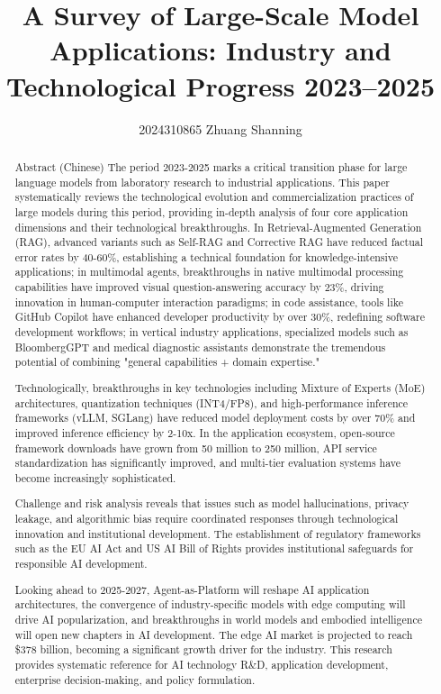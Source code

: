 \documentclass{article}
\title{A Survey of Large-Scale Model Applications: Industry and Technological Progress 2023–2025}
\author{2024310865 Zhuang Shanning}
\begin{document}
\maketitle

\begin{abstract}
  Abstract (Chinese)  
  The period 2023-2025 marks a critical transition phase for large language models from laboratory research to industrial applications. This paper systematically reviews the technological evolution and commercialization practices of large models during this period, providing in-depth analysis of four core application dimensions and their technological breakthroughs. In Retrieval-Augmented Generation (RAG), advanced variants such as Self-RAG and Corrective RAG have reduced factual error rates by 40-60\%, establishing a technical foundation for knowledge-intensive applications; in multimodal agents, breakthroughs in native multimodal processing capabilities have improved visual question-answering accuracy by 23\%, driving innovation in human-computer interaction paradigms; in code assistance, tools like GitHub Copilot have enhanced developer productivity by over 30\%, redefining software development workflows; in vertical industry applications, specialized models such as BloombergGPT and medical diagnostic assistants demonstrate the tremendous potential of combining "general capabilities + domain expertise."

  Technologically, breakthroughs in key technologies including Mixture of Experts (MoE) architectures, quantization techniques (INT4/FP8), and high-performance inference frameworks (vLLM, SGLang) have reduced model deployment costs by over 70\% and improved inference efficiency by 2-10x. In the application ecosystem, open-source framework downloads have grown from 50 million to 250 million, API service standardization has significantly improved, and multi-tier evaluation systems have become increasingly sophisticated.

  Challenge and risk analysis reveals that issues such as model hallucinations, privacy leakage, and algorithmic bias require coordinated responses through technological innovation and institutional development. The establishment of regulatory frameworks such as the EU AI Act and US AI Bill of Rights provides institutional safeguards for responsible AI development.

  Looking ahead to 2025-2027, Agent-as-Platform will reshape AI application architectures, the convergence of industry-specific models with edge computing will drive AI popularization, and breakthroughs in world models and embodied intelligence will open new chapters in AI development. The edge AI market is projected to reach \$378 billion, becoming a significant growth driver for the industry. This research provides systematic reference for AI technology R\&D, application development, enterprise decision-making, and policy formulation.


\end{abstract}
\end{document}
